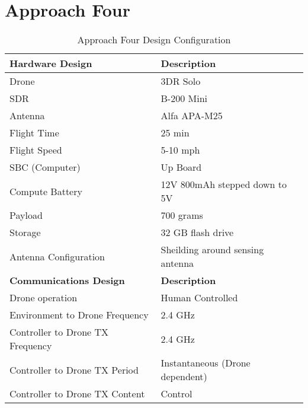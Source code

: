 \section{Approach Four}
\begin{table}[h]
\centering
\caption{Approach Four Design Configuration}
\label{table:approach_four}
\begin{tabular}{|l|l|}
    \hline  \textbf{Hardware Design}              & \textbf{Description}                      \\ \hline
            Drone                                 & 3DR Solo                                  \\
            SDR                                   & B-200 Mini                                \\
            Antenna                               & Alfa APA-M25                              \\
            Flight Time                           & 25 min                                    \\
            Flight Speed                          & 5-10 mph                                  \\
            SBC (Computer)                        & Up Board                                  \\
            Compute Battery                       & 12V 800mAh stepped down to 5V             \\
            Payload                               & 700 grams                                 \\
            Storage                               & 32 GB flash drive                         \\
            Antenna Configuration                 & Sheilding around sensing antenna          \\
    \hline  \textbf{Communications Design}        & \textbf{Description}                      \\ \hline
            Drone operation                       & Human Controlled                          \\
            Environment to Drone Frequency        & 2.4 GHz                                   \\
            Controller to Drone TX Frequency      & 2.4 GHz                                   \\
            Controller to Drone TX Period         & Instantaneous (Drone dependent)           \\
            Controller to Drone TX Content        & Control                                   \\

\end{tabular}
\end{table}
